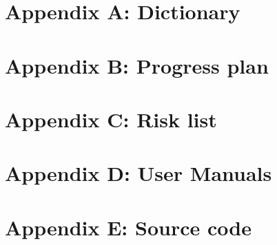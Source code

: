 \documentclass[a4paper,norsk,11pt]{article} %
\begin{document}
\section{Appendix A: Dictionary}

\section{Appendix B: Progress plan}

\section{Appendix C: Risk list}

\section{Appendix D: User Manuals}

\section{Appendix E: Source code}
\end{document}
